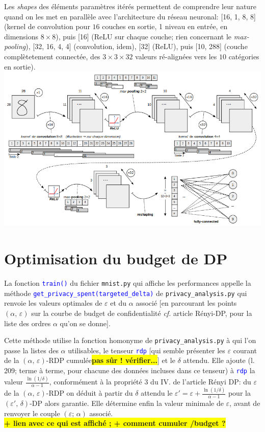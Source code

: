 \documentclass[a4paper,11pt]{article} %
\newcommand{\file}[1]{\colorbox{blue!10}{\texttt{#1}}}
\newcommand{\code}[1]{\textcolor{blue}{\texttt{#1}}}
\newcommand{\rem}[1]{\colorbox{yellow}{\textbf{#1}}}
\begin{document}
Les \emph{shapes} des éléments \og paramètres\fg{} itérés permettent de comprendre leur nature quand on les met en parallèle avec l'architecture du réseau neuronal: [16, 1, 8, 8] (kernel de convolution pour $16$ couches en sortie, 1 niveau en entrée, en dimensions $8\times8$), puis [16] (ReLU sur chaque couche; rien concernant le \emph{max-pooling}), [32, 16, 4, 4] (convolution, idem), [32] (ReLU), puis [10, 288] (couche complètetement connectée, des $3\times3\times32$ valeurs ré-alignées vers les $10$ catégories en sortie).\\
\hspace*{-0.2\textwidth}
\includegraphics[width=1.4\textwidth]{cnn.png}

\section{Optimisation du budget de DP}
La fonction \code{train()} du fichier \file{mnist.py} qui affiche les performances appelle la méthode  \code{get\_privacy\_spent(targeted\_delta)} de \file{privacy\_analysis.py} qui renvoie les valeurs optimales de $\varepsilon$ et du $\alpha$ associé [en parcourant les points $(\alpha,\,\varepsilon)$ sur la \og courbe de budget\fg{} de confidentialité \emph{cf.} article \og Rényi-DP\fg{}, pour la liste des ordres $\alpha$ qu'on se donne].

Cette méthode utilise la fonction homonyme de \file{privacy\_analysis.py} à qui l'on passe la listes des $\alpha$ utilisables, le tenseur \code{rdp} [qui semble présenter les $\varepsilon$ courant de la $(\alpha,\,\varepsilon)$-RDP cumulée\rem{pas sûr ! vérifier...}] et le $\delta$ attendu. Elle ajoute (l. 209; terme à terme, pour chacune des données incluses dans ce tenseur) à \code{rdp}  la valeur $\frac{\ln(1/\delta)}{\alpha-1}$, conformément à la propriété 3 du IV. de l'article \og Rényi DP\fg{}: du $\varepsilon$ de la $(\alpha,\,\varepsilon)$-RDP on déduit à partir du $\delta$ attendu le $\varepsilon' = \varepsilon + \frac{\ln(1/\delta)}{\alpha-1}$ pour la $(\varepsilon',\,\delta)$-DP alors garantie.  Elle détermine enfin la valeur minimale de $\varepsilon$, avant de renvoyer le couple $(\varepsilon;\,\alpha)$ associé.
\\\rem{+ lien avec ce qui est affiché ; + comment cumuler /budget ?}
\end{document}
